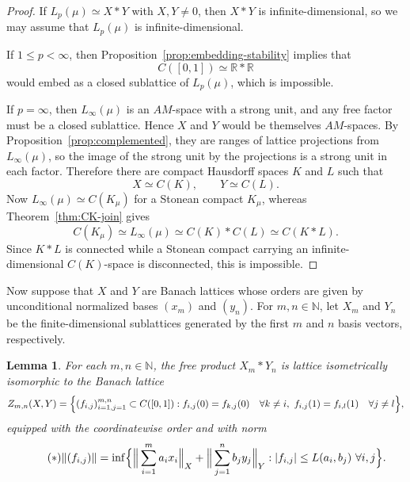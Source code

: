 \documentclass[12pt]{amsart}
\theoremstyle{plain}
\newtheorem{lemma}[theorem]{Lemma}
\theoremstyle{definition}
\begin{document}
\begin{proof}
If $L_p(\mu)\simeq X\ast Y$ with $X,Y\neq 0$, then $X\ast Y$ is infinite-dimensional, so we may assume that $L_p(\mu)$ is infinite-dimensional.

If $1\leq p<\infty$, then Proposition~\ref{prop:embedding-stability} implies that
\[
C([0,1])\simeq \mathbb{R}\ast \mathbb{R}
\]
would embed as a closed sublattice of $L_p(\mu)$, which is impossible.

If $p=\infty$, then $L_\infty(\mu)$ is an $AM$-space with a strong unit, and any free factor must be a closed sublattice. Hence $X$ and $Y$ would be themselves $AM$-spaces. By Proposition~\ref{prop:complemented}, they are ranges of lattice projections from $L_\infty(\mu)$, so the image of the strong unit by the projections is a strong unit in each factor. Therefore there are compact Hausdorff spaces $K$ and $L$ such that
\[
X\simeq C(K),
\qquad
Y\simeq C(L).
\]
Now $L_\infty(\mu)\simeq C(K_\mu)$ for a Stonean compact $K_\mu$, whereas Theorem~\ref{thm:CK-join} gives
\[
C(K_\mu)\simeq L_\infty(\mu)\simeq C(K)\ast C(L)\simeq C(K\ast L).
\]
Since $K\ast L$ is connected while a Stonean compact carrying an infinite-dimensional $C(K)$-space is disconnected, this is impossible.
\end{proof}
Now suppose that $X$ and $Y$ are Banach lattices whose orders are given by unconditional normalized bases $(x_m)$ and $(y_n)$. For $m,n\in \mathbb{N}$, let $X_m$ and $Y_n$ be the finite-dimensional sublattices generated by the first $m$ and $n$ basis vectors, respectively.

\begin{lemma}\label{lemma:kb-finite}
For each $m,n\in \mathbb{N}$, the free product $X_m\ast Y_n$ is lattice isometrically isomorphic to the Banach lattice
\[
Z_{m,n}(X,Y)=
\Bigl\{(f_{i,j})_{i=1,j=1}^{m,n}\subset C([0,1]):
f_{i,j}(0)=f_{k,j}(0)\quad\forall k\neq i,\ f_{i,j}(1)=f_{i,l}(1)\quad\forall j\neq l \Bigr\},
\]
equipped with the coordinatewise order and with norm
\begin{equation}\label{*}\tag{$*$}
\|(f_{i,j})\|
=
\inf\Bigl\{
\Big\|\sum_{i=1}^m a_i x_i\Big\|_X+\Big\|\sum_{j=1}^n b_j y_j\Big\|_Y:
|f_{i,j}|\leq L(a_i,b_j)\ \forall i,j
\Bigr\}.
\end{equation}
\end{lemma}
\end{document}
